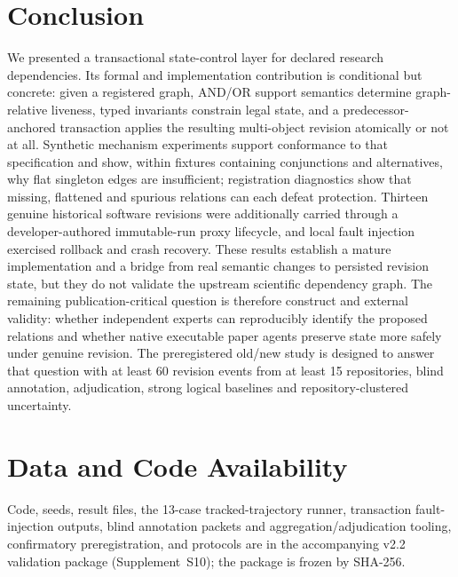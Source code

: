 \documentclass[journal]{IEEEtran}
\newcommand{\suppl}[1]{Supplement~#1}
\begin{document}
\section{Conclusion}
We presented a transactional state-control layer for declared research dependencies. Its formal and implementation contribution is conditional but concrete: given a registered graph, AND/OR support semantics determine graph-relative liveness, typed invariants constrain legal state, and a predecessor-anchored transaction applies the resulting multi-object revision atomically or not at all. Synthetic mechanism experiments support conformance to that specification and show, within fixtures containing conjunctions and alternatives, why flat singleton edges are insufficient; registration diagnostics show that missing, flattened and spurious relations can each defeat protection. Thirteen genuine historical software revisions were additionally carried through a developer-authored immutable-run proxy lifecycle, and local fault injection exercised rollback and crash recovery. These results establish a mature implementation and a bridge from real semantic changes to persisted revision state, but they do not validate the upstream scientific dependency graph. The remaining publication-critical question is therefore construct and external validity: whether independent experts can reproducibly identify the proposed relations and whether native executable paper agents preserve state more safely under genuine revision. The preregistered old/new study is designed to answer that question with at least 60 revision events from at least 15 repositories, blind annotation, adjudication, strong logical baselines and repository-clustered uncertainty.

\section*{Data and Code Availability}
Code, seeds, result files, the 13-case tracked-trajectory runner, transaction fault-injection outputs, blind annotation packets and aggregation/adjudication tooling, confirmatory preregistration, and protocols are in the accompanying v2.2 validation package (\suppl{S10}); the package is frozen by SHA-256.

\printbibliography
\end{document}
